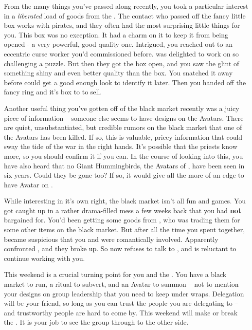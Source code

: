 \documentclass[char]{GL2020}
\begin{document}
From the many things you’ve passed along recently, you took a particular interest in a \emph{liberated} load of goods from the \pFarm{}. The contact who passed off the fancy little box works with pirates, and they often had the most surprising little things for you. This box was no exception. It had a charm on it to keep it from being opened - a very powerful, good quality one. Intrigued, you reached out to an eccentric curse worker you’d commissioned before. \cCurse{} was delighted to work on so challenging a puzzle. But then they got the box open, and you saw the glint of something shiny and even better quality than the box. You snatched it away before \cCurse{} could get a good enough look to identify it later. Then you handed off the fancy ring and it’s box to \cChupInventor{} to sell.

Another useful thing you’ve gotten off of the black market recently was a juicy piece of information -- someone else seems to have designs on the Avatars. There are quiet, unsubstantiated, but credible rumors on the black market that one of the \pShip{} Avatars has been killed. If so, this is valuable, pricey information that could sway the tide of the war in the right hands. It’s possible that the priests know more, so you should confirm it if you can. In the course of looking into this, you have also heard that no Giant Hummingbirds, the Avatars of \cFarmGod{}, have been seen in six years. Could they be gone too? If so, it would give \cGenesis{} all the more of an edge to have \cGenesis{\their} Avatar on \pEarth{}.

While interesting in it's own right, the black market isn’t all fun and games. You got caught up in a rather drama-filled mess a few weeks back that you had \textbf{not} bargained for. You’d been getting some goods from \cEthics{}, who was trading them for some other items on the black market. But after all the time you spent together, \cLibrarian{} became suspicious that you and \cEthics{} were romantically involved. Apparently \cLibrarian{} confronted \cEthics{}, and they broke up. So now \cLibrarian{} refuses to talk to \cEthics{}, and \cEthics{} is reluctant to continue working with you.

This weekend is a crucial turning point for you and the \pGoaties{}. You have a black market to run, a ritual to subvert, and an Avatar to summon -- not to mention your designs on group leadership that you need to keep under wraps. Delegation will be your friend, so long as you can trust the people you are delegating to -- and trustworthy people are hard to come by. This weekend will make or break the \pGoaties{}. It is your job to see the group through to the other side.
\end{document}
